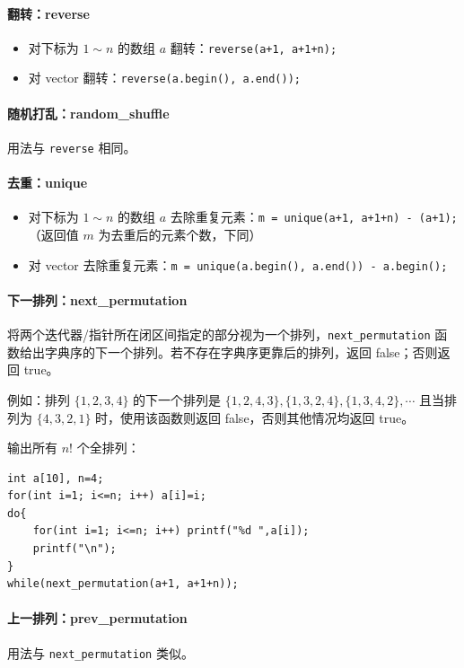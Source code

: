 \documentclass[UTF8]{ctexart}
\begin{document}
\paragraph{翻转：reverse}
\begin{itemize}
    \item 对下标为 $1\sim n$ 的数组 $a$ 翻转：\verb!reverse(a+1, a+1+n);!
    \item 对 vector 翻转：\verb!reverse(a.begin(), a.end());!
\end{itemize}

\paragraph{随机打乱：random\_shuffle} 用法与 \verb!reverse! 相同。

\paragraph{去重：unique}
\begin{itemize}
    \item 对下标为 $1\sim n$ 的数组 $a$ 去除重复元素：\verb!m = unique(a+1, a+1+n) - (a+1);!（返回值 $m$ 为去重后的元素个数，下同）
    \item 对 vector 去除重复元素：\verb!m = unique(a.begin(), a.end()) - a.begin();!
\end{itemize}

\paragraph{下一排列：next\_permutation}
将两个迭代器/指针所在闭区间指定的部分视为一个排列，\verb!next_permutation! 函数给出字典序的下一个排列。若不存在字典序更靠后的排列，返回 false；否则返回 true。

例如：排列 $\{1,2,3,4\}$ 的下一个排列是 $\{1,2,4,3\},\{1,3,2,4\},\{1,3,4,2\},\cdots$ 且当排列为 $\{4,3,2,1\}$ 时，使用该函数则返回 false，否则其他情况均返回 true。

输出所有 $n!$ 个全排列：
\begin{lstlisting}
int a[10], n=4;
for(int i=1; i<=n; i++) a[i]=i;
do{
	for(int i=1; i<=n; i++) printf("%d ",a[i]);
	printf("\n");
}
while(next_permutation(a+1, a+1+n));
\end{lstlisting}

\paragraph{上一排列：prev\_permutation} 用法与 \verb!next_permutation! 类似。
\end{document}
